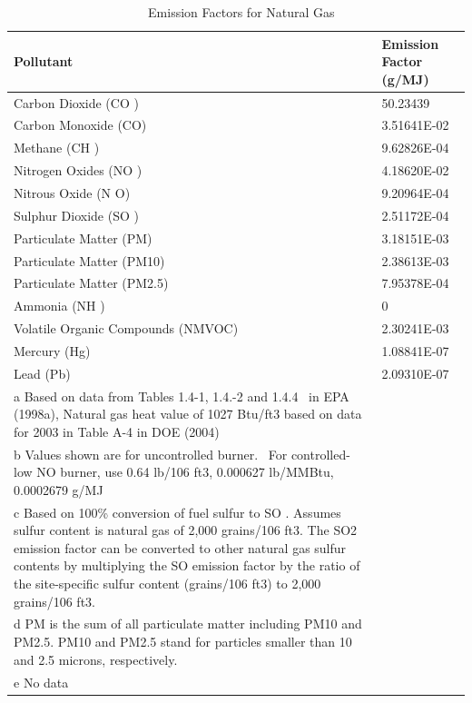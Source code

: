 \begin{longtable}[c]{p{4.5in}p{1.5in}}
\caption{  Emission Factors for Natural Gas \protect \label{table:emission-factors-for-natural-gas}}\\
\toprule 
Pollutant & Emission Factor  ~~ (g/MJ) \tabularnewline \midrule
\endhead
Carbon Dioxide (CO  ) & 50.23439 \tabularnewline
Carbon Monoxide (CO) & 3.51641E-02 \tabularnewline
Methane (CH  ) & 9.62826E-04 \tabularnewline
Nitrogen Oxides (NO  ) & 4.18620E-02 \tabularnewline
Nitrous Oxide (N  O) & 9.20964E-04 \tabularnewline
Sulphur Dioxide (SO  ) & 2.51172E-04 \tabularnewline
Particulate Matter (PM) & 3.18151E-03 \tabularnewline
Particulate Matter (PM10) & 2.38613E-03 \tabularnewline
Particulate Matter (PM2.5) & 7.95378E-04 \tabularnewline
Ammonia (NH  ) & 0 \tabularnewline
Volatile Organic Compounds (NMVOC) & 2.30241E-03 \tabularnewline
Mercury (Hg) & 1.08841E-07 \tabularnewline
Lead (Pb) & 2.09310E-07 \tabularnewline
a Based on data from Tables 1.4-1, 1.4.-2 and 1.4.4~ in EPA (1998a), Natural gas heat value of 1027 Btu/ft3 based on data for 2003 in Table A-4 in DOE (2004) \tabularnewline
b Values shown are for uncontrolled burner.~ For controlled-low NO   burner, use 0.64 lb/106 ft3, 0.000627 lb/MMBtu, 0.0002679 g/MJ \tabularnewline
c Based on 100\% conversion of fuel sulfur to SO  . Assumes sulfur content is natural gas of 2,000 grains/106 ft3. The SO2 emission factor can be converted to other natural gas sulfur contents by multiplying the SO   emission factor by the ratio of the site-specific sulfur content (grains/106 ft3) to 2,000 grains/106 ft3. \tabularnewline
d PM is the sum of all particulate matter including PM10 and PM2.5. PM10 and PM2.5 stand for particles smaller than 10 and 2.5 microns, respectively. \tabularnewline
e No data \tabularnewline
\bottomrule
\end{longtable}

